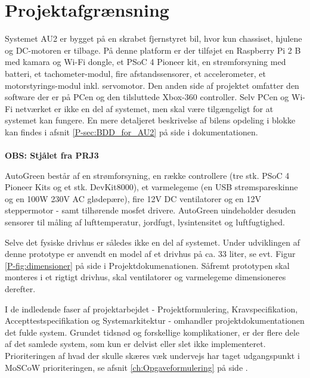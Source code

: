 \chapter{Projektafgrænsning} \label{ch:Projektafgraensning}

Systemet AU2 er bygget på en skrabet fjernstyret bil, hvor kun chassiset, hjulene og DC-motoren er tilbage. 
På denne platform er der tilføjet en Raspberry Pi 2 B med kamara og Wi-Fi dongle, et PSoC 4 Pioneer kit, en strømforsyning med batteri, et tachometer-modul, fire afstandssensorer, et accelerometer, et motorstyrings-modul inkl. servomotor. 
Den anden side af projektet omfatter den software der er på PCen og den tilsluttede Xbox-360 controller. 
Selv PCen og Wi-Fi netværket er ikke en del af systemet, men skal være tilgængeligt for at systemet kan fungere. 
En mere detaljeret beskrivelse af bilens opdeling i blokke kan findes i afsnit \ref{P-sec:BDD_for_AU2}  på side \pageref{P-sec:BDD_for_AU2} i dokumentationen.\\\\


\textbf{OBS: Stjålet fra PRJ3}

AutoGreen består af en strømforsyning, en række controllere (tre stk. PSoC 4 Pioneer Kits og et stk. DevKit8000), et varmelegeme (en USB strømspareskinne og en 100W 230V AC glødepære), fire 12V DC ventilatorer og en 12V steppermotor - samt tilhørende mosfet drivere. 
AutoGreen uindeholder desuden sensorer til måling af lufttemperatur, jordfugt, lysintensitet og luftfugtighed.

Selve det fysiske drivhus er således ikke en del af systemet. 
Under udviklingen af denne prototype er anvendt en model af et drivhus på ca. 33 liter, se evt. Figur \ref{P-fig:dimensioner} på side \pageref{P-fig:dimensioner} i Projektdokumenationen. 
Såfremt prototypen skal monteres i et rigtigt drivhus, skal ventilatorer og varmelegeme dimensioneres derefter.

\mbox{}

I de indledende faser af projektarbejdet - Projektformulering, Kravspecifikation, Accepttestspecifikation og Systemarkitektur - omhandler projektdokumentationen det fulde system.
Grundet tidsnød og forskellige komplikationer, er der flere dele af det samlede system, som kun er delvist eller slet ikke implementeret.
Prioriteringen af hvad der skulle skæres væk undervejs har taget udgangspunkt i MoSCoW prioriteringen, se afsnit \ref{ch:Opgaveformulering}  på side \pageref{ch:Opgaveformulering}.

